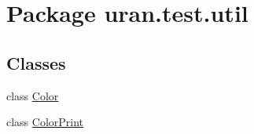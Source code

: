 \hypertarget{namespaceuran_1_1test_1_1util}{}\section{Package uran.\+test.\+util}
\label{namespaceuran_1_1test_1_1util}
\subsection*{Classes}
\begin{DoxyCompactItemize}
\item 
class \hyperlink{classuran_1_1test_1_1util_1_1_color}{Color}
\item 
class \hyperlink{classuran_1_1test_1_1util_1_1_color_print}{Color\+Print}
\end{DoxyCompactItemize}
